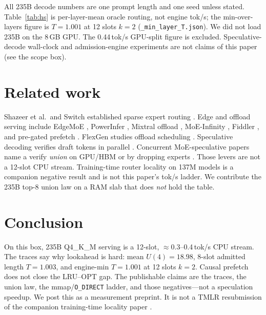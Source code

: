 \documentclass[11pt]{article}
\newcommand{\tps}{tok/s}
\begin{document}
All 235B decode numbers are one prompt length and one seed unless stated.
Table~\ref{tab:hs} is per-layer-mean oracle routing, not engine tok/s; the
min-over-layers figure is $T{=}1.001$ at 12 slots $k{=}2$
(\texttt{\_min\_layer\_T.json}). We did not load 235B on the 8\,GB GPU. The
0.44\,\tps{} GPU-split figure is excluded. Speculative-decode wall-clock
and admission-engine experiments are not claims of this paper (see the
scope box).

\section{Related work}
\label{sec:rw}

Shazeer et al.\ and Switch established sparse expert routing
\citep{shazeer2017moe,fedus2022switch}. Edge and offload serving include
EdgeMoE \citep{yi2023edgemoe}, PowerInfer \citep{song2024powerinfer},
Mixtral offload \citep{eliseev2023mixtraloffload}, MoE-Infinity
\citep{xue2024moeinfinity}, Fiddler \citep{kamahori2025fiddler}, and pre-gated
prefetch \citep{hwang2023pregated}. FlexGen studies offload scheduling
\citep{sheng2023flexgen}. Speculative decoding verifies draft tokens in
parallel \citep{leviathan2023speculative,cai2024medusa,li2024eagle}. Concurrent
MoE-speculative papers name a verify \emph{union} on GPU/HBM or by dropping
experts \citep{mcdanel2026moespec,liang2026acceptmoe,xie2026ecospec,pan2026evict}.
Those levers are not a 12-slot CPU stream. Training-time router locality on
137M models is a companion negative result \citep{suram2026cacheable} and is
not this paper's tok/s ladder. We contribute the 235B top-8 union law on a RAM
slab that does \emph{not} hold the table.

\section{Conclusion}
\label{sec:conc}

On this box, 235B Q4\_K\_M serving is a 12-slot, $\approx$0.3--0.4\,\tps{} CPU
stream. The traces say why lookahead is hard: mean $U(4)=18.98$, 8-slot
admitted length $T{=}1.003$, and engine-min $T{=}1.001$ at 12 slots $k{=}2$.
Causal prefetch does not close the LRU--OPT gap. The publishable claims are
the traces, the union law, the mmap/\texttt{O\_DIRECT} ladder, and those
negatives---not a speculation speedup. We post this as a measurement
preprint. It is not a TMLR resubmission of the companion training-time
locality paper \citep{suram2026cacheable}.
\end{document}
